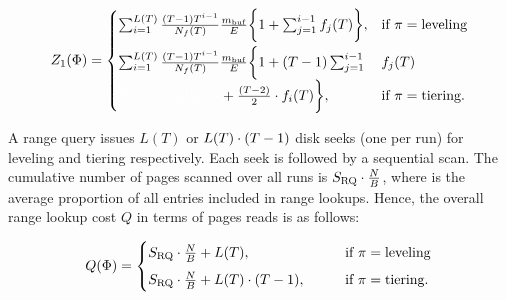 \begin{equation}
\label{eq:read-non-empty}
Z_1(\configuration) =
\begin{cases}
    \sum_{i=1}^{L(T)} \frac{(T-1)T^{i-1}}{N_f(T)} \frac{\mbuf}{E} \bigg\{1 +
    \sum_{j=1}^{i-1}f_j(T)\bigg\}, &\text{if } \policy=\text{leveling} \\[8pt]
    \sum_{i=1}^{L(T)} \frac{(T-1)T^{i-1}}{N_f(T)} \frac{\mbuf}{E} \bigg\{1 +
        (T-1)\sum_{j=1}^{i-1}&f_j(T)\\
    {\color{white}\sum_{i=1}^{L(T)} \frac{(T-1)T^{i-1}}{N_f(T)}} +
\frac{(T-2)}{2}\cdot f_i(T)\bigg\}, &\text{if } \policy=\text{tiering}.  \\
\end{cases}
\end{equation}


A range query issues $L(T)$ or $L(T) \cdot ({{T}}-1)$ disk seeks 
    (one per run) for leveling and tiering respectively.
Each seek is followed by a sequential scan. The cumulative number of pages
    scanned over all runs is ${{S_\mathrm{RQ}}} \cdot \frac{N}{B}$, where {\querySel} 
    is the average proportion of all entries included in range lookups.  
Hence, the overall range lookup cost $Q$ in terms of pages reads is as follows: 

\begin{equation} 
\label{eq:range}
Q({{\Phi}}) = 
\begin{cases}
    {{\ensuremath{S_\mathrm{RQ}}}} \cdot \frac{N}{B} + L(T),  ~~ & \text{if } {{\ensuremath{\pi}}}=\text{leveling}  \\[5pt]
    {{\ensuremath{S_\mathrm{RQ}}}} \cdot \frac{N}{B} + L(T) \cdot ({{T}}-1)  , \qquad     & \text{if } {{\ensuremath{\pi}}}=\text{tiering.}  \\
\end{cases}  \\
\end{equation}

